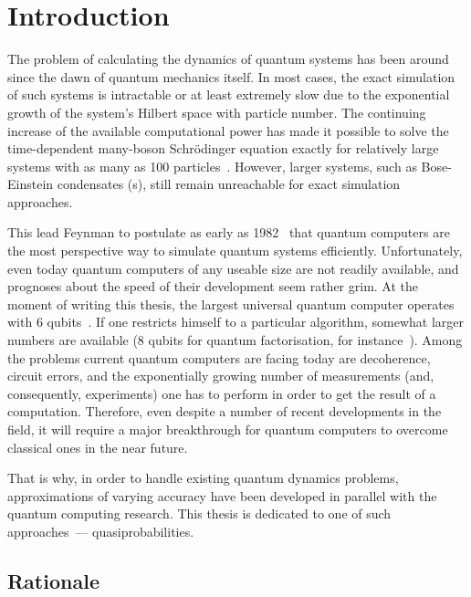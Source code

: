 \chapter{Introduction}

The problem of calculating the dynamics of quantum systems has been around since the dawn of quantum mechanics itself.
In most cases, the exact simulation of such systems is intractable or at least extremely slow due to the exponential growth of the system's Hilbert space with particle number.
The continuing increase of the available computational power has made it possible to solve the time-dependent many-boson Schr\"odinger equation exactly for relatively large systems with as many as 100 particles~\cite{Sakmann2009}.
However, larger systems, such as Bose-Einstein condensates (s), still remain unreachable for exact simulation approaches.

This lead Feynman to postulate as early as 1982~\cite{Feynman1982} that quantum computers are the most perspective way to simulate quantum systems efficiently.
Unfortunately, even today quantum computers of any useable size are not readily available, and prognoses about the speed of their development seem rather grim.
At the moment of writing this thesis, the largest universal quantum computer operates with 6 qubits~\cite{Lanyon2011}.
If one restricts himself to a particular algorithm, somewhat larger numbers are available (8 qubits for quantum factorisation, for instance~\cite{Xu2012}).
Among the problems current quantum computers are facing today are decoherence, circuit errors, and the exponentially growing number of measurements (and, consequently, experiments) one has to perform in order to get the result of a computation.
Therefore, even despite a number of recent developments in the field, it will require a major breakthrough for quantum computers to overcome classical ones in the near future.

That is why, in order to handle existing quantum dynamics problems, approximations of varying accuracy have been developed in parallel with the quantum computing research.
This thesis is dedicated to one of such approaches~--- quasiprobabilities.


\section{Rationale}

